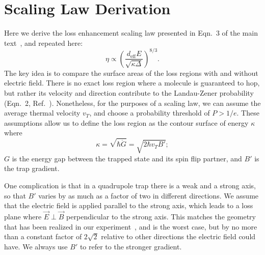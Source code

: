 \documentclass[%
 reprint,
 amsmath,amssymb,
 aps,
pra,
]{revtex4-1}
\begin{document}
\section{Scaling Law Derivation\label{sec:der}}

Here we derive the loss enhancement scaling law presented in Eqn.~3 of the main text~\cite{smt}, and repeated here:
\begin{equation}
\eta\propto \left(\frac{d_\text{eff}E}{\sqrt{\kappa\Delta}}\right)^{8/3}.
\end{equation}
The key idea is to compare the surface areas of the loss regions with and without electric field. 
There is no exact loss region where a molecule is guaranteed to hop, but rather its velocity and direction contribute to the Landau-Zener probability (Eqn.~2, Ref.~\cite{smt}).
Nonetheless, for the purposes of a scaling law, we can assume the average thermal velocity $v_T$, and choose a probability threshold of $P>1/e$.
These assumptions allow us to define the loss region as the contour surface of energy $\kappa$ where 
\begin{equation}
\kappa=\sqrt{\hbar\dot{G}}=\sqrt{2\hbar v_T B'};
\end{equation} 
$G$ is the energy gap between the trapped state and its spin flip partner, and $B'$ is the trap gradient.

One complication is that in a quadrupole trap there is a weak and a strong axis, so that $B'$ varies by as much as a factor of two in different directions.
We assume that the electric field is applied parallel to the strong axis, which leads to a loss plane where $\vec{E}\perp\vec{B}$ perpendicular to the strong axis. 
This matches the geometry that has been realized in our experiment~\cite{Stuhl2013}, and is the worst case, but by no more than a constant factor of $2\sqrt{2}$ relative to other directions the electric field could have.
We always use $B'$ to refer to the stronger gradient.
\end{document}
